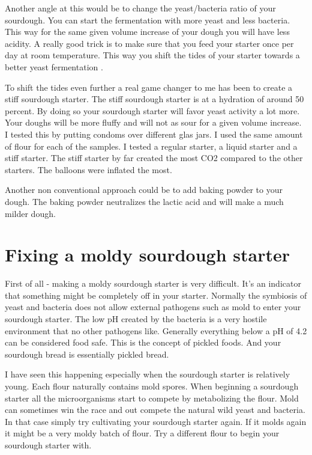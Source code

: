 Another angle at this would be to change the yeast/bacteria
ratio of your sourdough. You can start the fermentation with
more yeast and less bacteria. This way for the same given
volume increase of your dough you will have less acidity.
A really good trick is to make sure that you feed your starter
once per day at room temperature. This way you shift
the tides of your starter towards a better yeast fermentation \cite*{more+active+starter}.

To shift the tides even further a real game changer
to me has been to create a stiff sourdough starter. The
stiff sourdough starter is at a hydration of around 50 percent.
By doing so your sourdough starter will favor yeast
activity a lot more. Your doughs will be more fluffy and will
not as sour for a given volume increase. I tested this
by putting condoms over different glas jars. I used
the same amount of flour for each of the samples.
I tested a regular starter, a liquid starter and a stiff
starter. The stiff starter by far created the most CO2
compared to the other starters. The balloons were inflated
the most. \cite{stiff+starter}

Another non conventional approach could be to add baking
powder to your dough. The baking powder neutralizes the
lactic acid and will make a much milder dough.\cite{baking+powder+reduce-acidity}

\section{Fixing a moldy sourdough starter}

First of all - making a moldy sourdough starter is very difficult.
It's an indicator that something might be completely off in your starter.
Normally the symbiosis of yeast and bacteria does not allow external
pathogens such as mold to enter your sourdough starter.
The low pH created by the bacteria is a very hostile environment
that no other pathogens like. Generally everything below a pH
of 4.2 can be considered food safe\cite{food+safe+ph}. This
is the concept of pickled foods. And your sourdough bread
is essentially pickled bread.

I have seen this happening especially when the sourdough
starter is relatively young. Each flour naturally contains
mold spores. When beginning a sourdough starter all
the microorganisms start to compete by metabolizing the
flour. Mold can sometimes win the race and out compete
the natural wild yeast and bacteria. In that case simply
try cultivating your sourdough starter again. If it molds
again it might be a very moldy batch of flour. Try a different
flour to begin your sourdough starter with.

